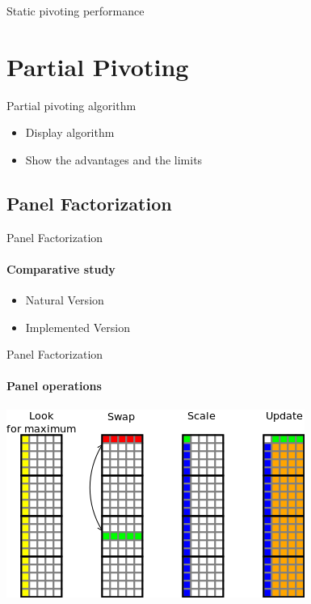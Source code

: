 \documentclass{beamer}
\begin{document}
\begin{frame}{Static pivoting performance}
\end{frame}

\section{Partial Pivoting}

\begin{frame}{Partial pivoting algorithm}
\begin{itemize}
\item Display algorithm
\item Show the advantages and the limits
\end{itemize}
\end{frame}

\subsection{Panel Factorization}

\begin{frame}{Panel Factorization}
\framesubtitle{Comparative study}
\begin{itemize}
\item Natural Version
\item Implemented Version
\end{itemize}
\end{frame}

\begin{frame}{Panel Factorization}
\framesubtitle{Panel operations}
\begin{center}
\includegraphics[scale=0.8]{panel_operation.png}
\end{center}
\end{frame}
\end{document}
